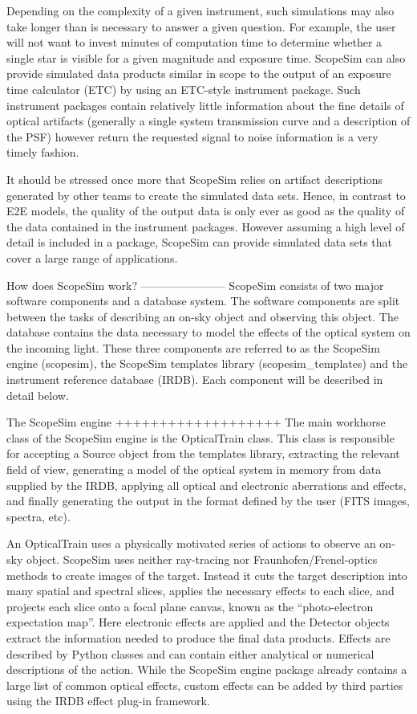 Depending on the complexity of a given instrument, such simulations may also
take longer than is necessary to answer a given question. For example, the user
will not want to invest minutes of computation time to determine whether a
single star is visible for a given magnitude and exposure time. ScopeSim can
also provide simulated data products similar in scope to the output of an
exposure time calculator (ETC) by using an ETC-style instrument package.
Such instrument packages contain relatively little information about the
fine details of optical artifacts (generally a single system transmission curve
and a description of the PSF) however return the requested signal to noise
information is a very timely fashion.

It should be stressed once more that ScopeSim relies on artifact descriptions
generated by other teams to create the simulated data sets. Hence, in contrast
to E2E models, the quality of the output data is only ever as good as the
quality of the data contained in the instrument packages. However assuming a
high level of detail is included in a package, ScopeSim can provide
simulated data sets that cover a large range of applications.


How does ScopeSim work?
-----------------------
ScopeSim consists of two major software components and a database system. The
software components are split between the tasks of describing an on-sky object
and observing this object. The database contains the data necessary to model the
effects of the optical system on the incoming light. These three components are
referred to as the ScopeSim engine (scopesim), the ScopeSim templates library
(scopesim_templates) and the instrument reference database (IRDB). Each
component will be described in detail below.


The ScopeSim engine
+++++++++++++++++++
The main workhorse class of the ScopeSim engine is the OpticalTrain class. This
class is responsible for accepting a Source object from the templates library,
extracting the relevant field of view, generating a model of the optical system
in memory from data supplied by the IRDB, applying all optical and electronic
aberrations and effects, and finally generating the output in the format
defined by the user (FITS images, spectra, etc).

An OpticalTrain uses a physically motivated series of actions to observe an
on-sky object. ScopeSim uses neither ray-tracing nor Fraunhofen/Frenel-optics
methods to create images of the target. Instead it cuts the target description
into many spatial and spectral slices, applies the necessary effects to each
slice, and projects each slice onto a focal plane canvas, known as the
``photo-electron expectation map''. Here electronic effects are applied and the
Detector objects extract the information needed to produce the final data
products. Effects are described by Python classes and can contain
either analytical or numerical descriptions of the action. While the ScopeSim
engine package already contains a large list of common optical effects, custom
effects can be added by third parties using the IRDB effect plug-in framework.


